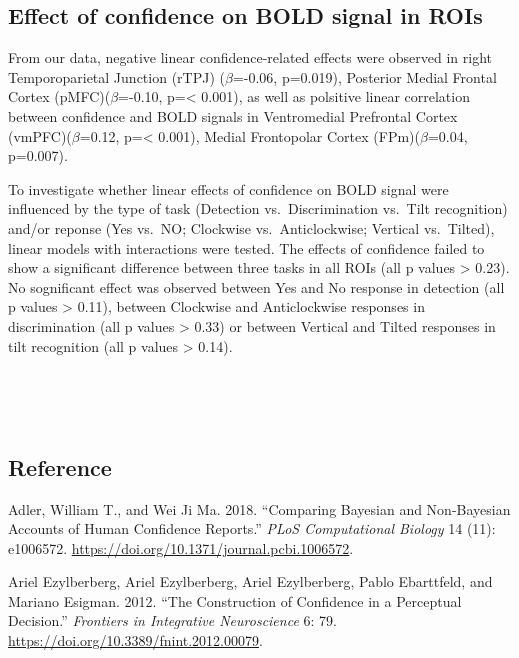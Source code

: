 \documentclass[
]{article}
\begin{document}
\hypertarget{effect-of-confidence-on-bold-signal-in-rois}{%
\subsection{Effect of confidence on BOLD signal in
ROIs}\label{effect-of-confidence-on-bold-signal-in-rois}}

From our data, negative linear confidence-related effects were observed
in right Temporoparietal Junction (rTPJ) (\(\beta\)=-0.06, p=0.019),
Posterior Medial Frontal Cortex (pMFC)(\(\beta\)=-0.10, p=\textless{}
0.001), as well as polsitive linear correlation between confidence and
BOLD signals in Ventromedial Prefrontal Cortex (vmPFC)(\(\beta\)=0.12,
p=\textless{} 0.001), Medial Frontopolar Cortex (FPm)(\(\beta\)=0.04,
p=0.007).

To investigate whether linear effects of confidence on BOLD signal were
influenced by the type of task (Detection vs.~Discrimination vs.~Tilt
recognition) and/or reponse (Yes vs.~NO; Clockwise vs.~Anticlockwise;
Vertical vs.~Tilted), linear models with interactions were tested. The
effects of confidence failed to show a significant difference between
three tasks in all ROIs (all p values \textgreater{} 0.23). No
sognificant effect was observed between Yes and No response in detection
(all p values \textgreater{} 0.11), between Clockwise and Anticlockwise
responses in discrimination (all p values \textgreater{} 0.33) or
between Vertical and Tilted responses in tilt recognition (all p values
\textgreater{} 0.14).

~

~

\hypertarget{reference}{%
\subsection*{Reference}\label{reference}}

\hypertarget{refs}{}
\leavevmode\hypertarget{ref-adler2018pcb}{}%
Adler, William T., and Wei Ji Ma. 2018. ``Comparing Bayesian and
Non-Bayesian Accounts of Human Confidence Reports.'' \emph{PLoS
Computational Biology} 14 (11): e1006572.
\url{https://doi.org/10.1371/journal.pcbi.1006572}.

\leavevmode\hypertarget{ref-arielezylberberg2012fin}{}%
Ariel Ezylberberg, Ariel Ezylberberg, Ariel Ezylberberg, Pablo
Ebarttfeld, and Mariano Esigman. 2012. ``The Construction of Confidence
in a Perceptual Decision.'' \emph{Frontiers in Integrative Neuroscience}
6: 79. \url{https://doi.org/10.3389/fnint.2012.00079}.
\end{document}
